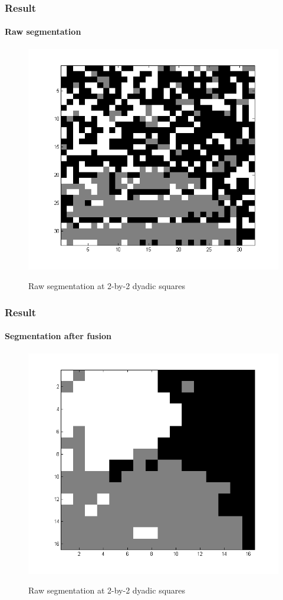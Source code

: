 \documentclass[12pt]{beamer}
\begin{document}
\begin{frame}
  \frametitle{Result}
  \framesubtitle{Raw segmentation}
  
  \begin{figure}[H]
  \centering
  \includegraphics[scale=0.3]{../figs/raw_seg_k=7}
  \label{fig:tm1_1_1}
  \caption{Raw segmentation at 2-by-2 dyadic squares}
  \end{figure} 
  
\end{frame}

\begin{frame}
  \frametitle{Result}
  \framesubtitle{Segmentation after fusion}
  
  \begin{figure}[H]
  \centering
  \includegraphics[scale=0.3]{../figs/fused_seg_k=5}
  \label{fig:tm1_1_1}
  \caption{Raw segmentation at 2-by-2 dyadic squares}
  \end{figure} 
  
\end{frame}
\end{document}
